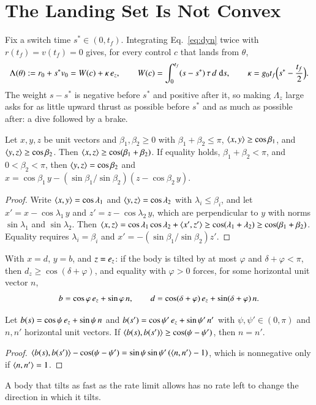 \section{The Landing Set Is Not Convex}\label{sec:dive}
Fix a switch time $s^*\in(0,t_f)$. Integrating Eq.~\eqref{eq:dyn} twice with $r(t_f)=v(t_f)=0$ gives, for every control $c$
that lands from $\theta$,
\begin{equation}\label{eq:lambda}
\Lambda(\theta):=r_0+s^*v_0=W(c)+\kappa\,e_z,\qquad W(c)=\int_0^{t_f}(s-s^*)\,\tau\,d\;\mathrm ds,\qquad
\kappa=g_0t_f\Bigl(s^*-\frac{t_f}{2}\Bigr).
\end{equation}
The weight $s-s^*$ is negative before $s^*$ and positive after it, so making $\Lambda_z$ large asks for as little upward
thrust as possible before $s^*$ and as much as possible after: a dive followed by a brake.

\begin{lemma}\label{lem:tri}
Let $x,y,z$ be unit vectors and $\beta_1,\beta_2\ge0$ with $\beta_1+\beta_2\le\pi$, $\langle x,y\rangle\ge\cos\beta_1$, and
$\langle y,z\rangle\ge\cos\beta_2$. Then $\langle x,z\rangle\ge\cos(\beta_1+\beta_2)$. If equality holds, $\beta_1+\beta_2<\pi$, and $0<\beta_2<\pi$,
then $\langle y,z\rangle=\cos\beta_2$ and $x=\cos\beta_1\,y-(\sin\beta_1/\sin\beta_2)(z-\cos\beta_2\,y)$.
\end{lemma}
\begin{proof}
Write $\langle x,y\rangle=\cos\lambda_1$ and $\langle y,z\rangle=\cos\lambda_2$ with $\lambda_i\le\beta_i$, and let $x'=x-\cos\lambda_1\,y$ and
$z'=z-\cos\lambda_2\,y$, which are perpendicular to $y$ with norms $\sin\lambda_1$ and $\sin\lambda_2$. Then
$\langle x,z\rangle=\cos\lambda_1\cos\lambda_2+\langle x',z'\rangle\ge\cos(\lambda_1+\lambda_2)\ge\cos(\beta_1+\beta_2)$. Equality requires
$\lambda_i=\beta_i$ and $x'=-(\sin\beta_1/\sin\beta_2)z'$.
\end{proof}
With $x=d$, $y=b$, and $z=e_z$: if the body is tilted by at most $\varphi$ and $\delta+\varphi<\pi$, then
$d_z\ge\cos(\delta+\varphi)$, and equality with $\varphi>0$ forces, for some horizontal unit vector $n$,
\begin{equation}\label{eq:extremal}
b=\cos\varphi\,e_z+\sin\varphi\,n,\qquad d=\cos(\delta+\varphi)\,e_z+\sin(\delta+\varphi)\,n .
\end{equation}

\begin{lemma}[Rigidity]\label{lem:rigid}
Let $b(s)=\cos\psi\,e_z+\sin\psi\,n$ and $b(s')=\cos\psi'\,e_z+\sin\psi'\,n'$ with $\psi,\psi'\in(0,\pi)$ and $n,n'$
horizontal unit vectors. If $\langle b(s),b(s')\rangle\ge\cos(\psi-\psi')$, then $n=n'$.
\end{lemma}
\begin{proof}
$\langle b(s),b(s')\rangle-\cos(\psi-\psi')=\sin\psi\sin\psi'\,(\langle n,n'\rangle-1)$, which is nonnegative only if $\langle n,n'\rangle=1$.
\end{proof}
A body that tilts as fast as the rate limit allows has no rate left to change the direction in which it tilts.

